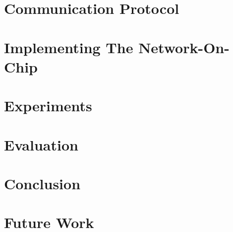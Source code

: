 \documentclass[
	paper=a4,
	fontsize=11pt,
	parskip=full %
]{scrreprt}
\begin{document}
    \chapter{Communication Protocol}\label{ch:protocol}
    

    \chapter{Implementing The Network-On-Chip}\label{ch:implementation}
    

    \chapter{Experiments}\label{ch:experiments}
    

    \chapter{Evaluation}\label{ch:evaluation}
    

    \chapter{Conclusion}\label{ch:conclusion}
    

    \chapter{Future Work}\label{ch:futurework}
    
\end{document}
